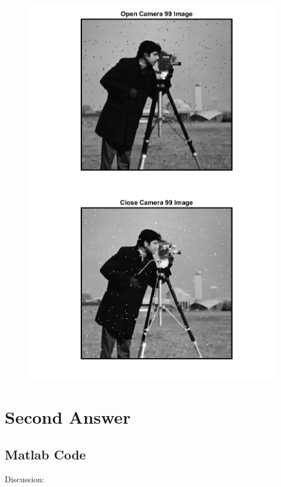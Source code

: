 \documentclass[11pt]{article} %
\begin{document}
\begin{figure}
 \centering
	\includegraphics{1ac.png}
	\includegraphics{1ad.png}
\end{figure}

\clearpage

\section {Second Answer}
\subsection*{Matlab Code}

Discussion:\break
\break
\end{document}
